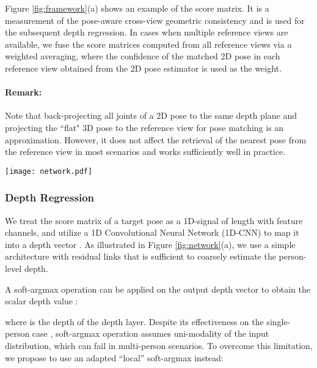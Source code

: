 \documentclass[final]{cvpr}
\begin{document}
Figure \ref{fig:framework}(a) shows an example of the score matrix.
It is a measurement of the pose-aware cross-view geometric consistency and is used for the subsequent depth regression.
In cases when multiple reference views are available, we fuse the score matrices computed from all reference views via a weighted averaging, where the confidence of the matched 2D pose  in each reference view obtained from the 2D pose estimator is used as the weight.

\vspace{-3mm} \paragraph{Remark:}
Note that back-projecting all joints of a 2D pose to the same depth plane and projecting the ``flat" 3D pose to the reference view for pose matching is an approximation. However, it does not affect the retrieval of the nearest pose from the reference view in most scenarios and works sufficiently well in practice.

\begin{figure*}[t]
    \centering
    \texttt{[image: network.pdf]}
    \caption{Network structure of (a) the person-level depth regression network, (b) the joint-level depth regression network, and (c) the dilated convolution module used in (b). Each block ``Conv - '' consists of a 1D convolution with kernel size  followed by the batch normalization \cite{ioffe2015batch} and ReLU operations. The numbers in  denote the channel size. Residual links are used in both networks.}
    \vspace{-2mm}
    \label{fig:network}
\end{figure*}


\subsubsection{Depth Regression}

We treat the score matrix  
of a target pose 
as a 1D-signal of length  with  feature channels, and
utilize a 1D Convolutional Neural Network (1D-CNN) to map it into a depth vector .
As illustrated in Figure \ref{fig:network}(a), 
we use a simple architecture with residual links that is sufficient to coarsely estimate the person-level depth.

A soft-argmax operation can be applied on the output depth vector  to obtain the scalar depth value :

where  is the depth of the  depth layer.
Despite its effectiveness on the single-person case \cite{sun2018integral}, soft-argmax operation assumes uni-modality of the input distribution, which can fail in multi-person scenarios.
To overcome this limitation, we propose to use an adapted ``local'' soft-argmax instead:
\end{document}
